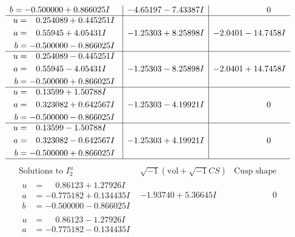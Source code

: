 \documentclass[1p]{elsarticle_modified}
\theoremstyle{definition}
\newcommand{\I}{\sqrt{-1}}
\begin{document}
$$\begin{array}{c|c|c}
\begin{aligned}
b &= -0.500000 + 0.866025 I\end{aligned}
 & -4.65197 - 7.43387 I & \phantom{-0.000000 } 0 \\ \hline\begin{aligned}
u &= \phantom{-}0.254089 + 0.445251 I \\
a &= \phantom{-}0.55945 + 4.05431 I \\
b &= -0.500000 - 0.866025 I\end{aligned}
 & -1.25303 + 8.25898 I & -2.0401 - 14.7458 I \\ \hline\begin{aligned}
u &= \phantom{-}0.254089 - 0.445251 I \\
a &= \phantom{-}0.55945 - 4.05431 I \\
b &= -0.500000 + 0.866025 I\end{aligned}
 & -1.25303 - 8.25898 I & -2.0401 + 14.7458 I \\ \hline\begin{aligned}
u &= \phantom{-}0.13599 + 1.50788 I \\
a &= \phantom{-}0.323082 + 0.642567 I \\
b &= -0.500000 - 0.866025 I\end{aligned}
 & -1.25303 - 4.19921 I & \phantom{-0.000000 } 0 \\ \hline\begin{aligned}
u &= \phantom{-}0.13599 - 1.50788 I \\
a &= \phantom{-}0.323082 - 0.642567 I \\
b &= -0.500000 + 0.866025 I\end{aligned}
 & -1.25303 + 4.19921 I & \phantom{-0.000000 } 0\\
 \hline 
 \end{array}$$\newpage$$\begin{array}{c|c|c}  
\text{Solutions to }I^u_{2}& \I (\text{vol} + \sqrt{-1}CS) & \text{Cusp shape}\\
 \hline 
\begin{aligned}
u &= \phantom{-}0.86123 + 1.27926 I \\
a &= -0.775182 + 0.134435 I \\
b &= -0.500000 - 0.866025 I\end{aligned}
 & -1.93740 + 5.36645 I & \phantom{-0.000000 } 0 \\ \hline\begin{aligned}
u &= \phantom{-}0.86123 - 1.27926 I \\
a &= -0.775182 - 0.134435 I \\

\end{aligned}
\end{array}$$
\end{document}
